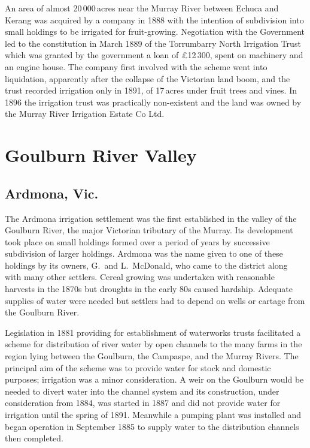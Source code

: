 An area of almost 20\,000\,acres near the Murray River between Echuca
and Kerang was acquired by a company in 1888 with the intention of
subdivision into small holdings to be irrigated for fruit-growing.
Negotiation with the Government led to the constitution in March 1889
of the Torrumbarry North Irrigation Trust
 which was granted by the
government a loan of
\pounds12\,300, spent on machinery and an engine house.  The company
first involved with the scheme went into liquidation, apparently after
the collapse of the Victorian land boom, and the trust recorded
irrigation only in 1891, of 17\,acres under fruit trees and vines.  In
1896 the irrigation trust was practically non-existent and the land
was owned by the Murray River Irrigation Estate Co Ltd.

\section*{Goulburn River Valley}

\subsection*{Ardmona, Vic.}

The Ardmona irrigation settlement was the first established in the
valley of the Goulburn River, the major Victorian tributary of the
Murray.  Its development took place on small holdings formed over a
period of years by successive subdivision of larger holdings.  Ardmona
was the name given to one of these holdings by its owners, G.~and
L.~McDonald,   who came to the district
along with many other settlers.  Cereal growing was undertaken with
reasonable harvests in the 1870s but droughts in the early 80s caused
hardship.  Adequate supplies of water were needed but settlers had to
depend on wells or cartage from the Goulburn River.

Legislation in 1881 providing for establishment of waterworks trusts
facilitated a scheme for distribution of river water by open channels
to the many farms in the region lying between the Goulburn, the
Campaspe, and the Murray Rivers.  The principal aim of the scheme was
to provide water for stock and domestic purposes; irrigation was a
minor consideration.  A weir on the Goulburn would be needed to divert
water into the channel system and its construction, under
consideration from 1884, was started in 1887 and did not provide water
for irrigation until the spring of 1891. Meanwhile a pumping plant was
installed and began operation in September 1885 to supply water to the
distribution channels then
completed.

